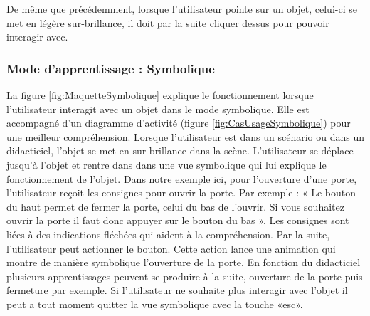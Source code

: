 De même que précédemment, lorsque l'utilisateur pointe sur un objet, celui-ci se met en légère sur-brillance, il doit par la suite cliquer dessus pour pouvoir interagir avec. %


\subsubsection{Mode d'apprentissage : Symbolique}

La figure \ref{fig:MaquetteSymbolique} explique le fonctionnement lorsque l'utilisateur interagit avec un objet dans le mode symbolique. Elle est accompagné d'un diagramme d'activité (figure \ref{fig:CasUsageSymbolique}) pour une meilleur compréhension.
\newline
Lorsque l'utilisateur est dans un scénario ou dans un didacticiel, l'objet se met en sur-brillance dans la scène. L'utilisateur se déplace jusqu'à l'objet et rentre dans dans une vue symbolique qui lui explique le fonctionnement de l'objet. Dans notre exemple ici, pour l'ouverture d'une porte, l'utilisateur reçoit les consignes pour ouvrir la porte. Par exemple : « Le bouton du haut permet de fermer la porte, celui du bas de l'ouvrir. Si vous souhaitez ouvrir la porte il faut donc appuyer sur le bouton du bas ». Les consignes sont liées à des indications fléchées qui aident à la compréhension. Par la suite, l'utilisateur peut actionner le bouton. Cette action lance une animation qui montre de manière symbolique l'ouverture de la porte. 
\newline
En fonction du didacticiel plusieurs apprentissages peuvent se produire à la suite, ouverture de la porte puis fermeture par exemple. Si l'utilisateur ne souhaite plus interagir avec l'objet il peut a tout moment quitter la vue symbolique avec la touche «esc». 

